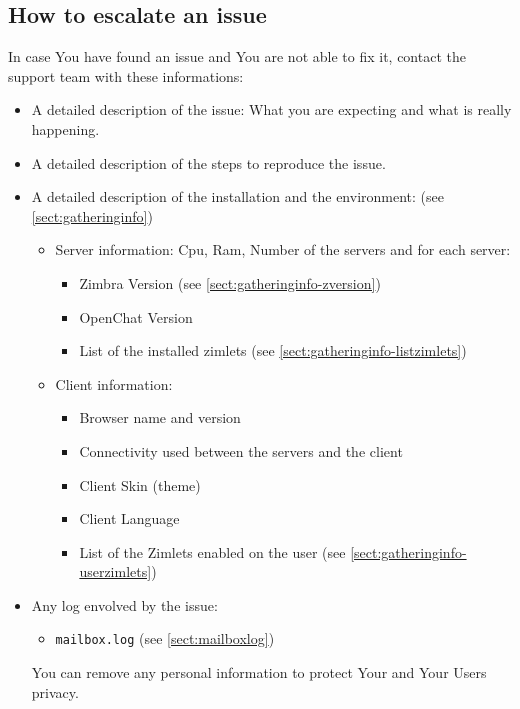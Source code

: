     \subsection[Escalate an issue]{How to escalate an issue}
        In case You have found an issue and You are not able to fix it, contact the support team with these informations:
        \begin{itemize}
            \item A detailed description of the issue: What you are expecting and what is really happening.
            \item A detailed description of the steps to reproduce the issue.
            \item A detailed description of the installation and the environment: (see \autoref{sect:gatheringinfo})
            \begin{itemize}
                \item Server information: Cpu, Ram, Number of the servers and for each server:
                \begin{itemize}
                    \item Zimbra Version (see \autoref{sect:gatheringinfo-zversion})
                    \item OpenChat Version
                    \item List of the installed zimlets (see \autoref{sect:gatheringinfo-listzimlets})
                \end{itemize}
                \item Client information:
                \begin{itemize}
                    \item Browser name and version
                    \item Connectivity used between the servers and the client
                    \item Client Skin (theme)
                    \item Client Language
                    \item List of the Zimlets enabled on the user (see \autoref{sect:gatheringinfo-userzimlets})
                \end{itemize}
            \end{itemize}
            \item Any log envolved by the issue:
            \begin{itemize}
                \item \verb+mailbox.log+ (see \autoref{sect:mailboxlog})
            \end{itemize}
            You can remove any personal information to protect Your and Your Users privacy.
        \end{itemize}
